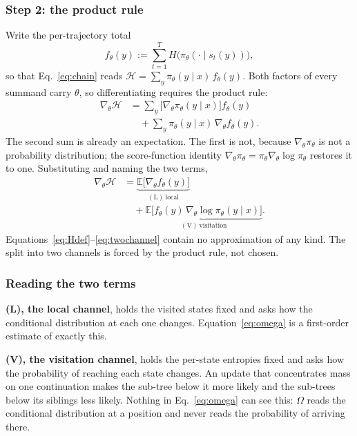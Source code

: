 \documentclass[11pt]{article}
\newcommand{\Htraj}{\mathcal{H}}
\newcommand{\Om}{\Omega}
\newcommand{\E}{\mathbb{E}}
\newcommand{\gradt}{\nabla_{\theta}}
\newcommand{\pit}{\pi_{\theta}}
\begin{document}
\subsubsection{Step 2: the product rule}

Write the per-trajectory total
%
\begin{equation}
f_\theta(y) := \sum_{t=1}^{T} H\bigl(\pit(\cdot \mid s_t(y))\bigr),
\label{eq:fdef}
\end{equation}
%
so that Eq.~\eqref{eq:chain} reads
$\Htraj = \sum_y \pit(y \mid x)\, f_\theta(y)$. Both factors of every summand carry
$\theta$, so differentiating requires the product rule:
%
\begin{equation}
\begin{split}
\gradt \Htraj
&= \sum_y \bigl[\gradt \pit(y \mid x)\bigr] f_\theta(y)\\
&\quad + \sum_y \pit(y \mid x)\, \gradt f_\theta(y).
\end{split}
\label{eq:productrule}
\end{equation}
%
The second sum is already an expectation. The first is not, because
$\gradt \pit$ is not a probability distribution; the score-function identity
$\gradt \pit = \pit \gradt \log \pit$ restores it to one. Substituting and naming
the two terms,
%
\begin{equation}
\begin{split}
\gradt \Htraj
&= \underbrace{\E\bigl[\gradt f_\theta(y)\bigr]}_{(\mathrm{L})\ \text{local}}\\
&\quad + \underbrace{\E\bigl[f_\theta(y)\,\gradt \log \pit(y \mid x)\bigr]}_{(\mathrm{V})\ \text{visitation}}.
\end{split}
\label{eq:twochannel-app}
\end{equation}
%
Equations~\eqref{eq:Hdef}--\eqref{eq:twochannel} contain no approximation of any
kind. The split into two channels is forced by the product rule, not chosen.

\subsubsection{Reading the two terms}

\textbf{(L), the local channel}, holds the visited states fixed and asks how the
conditional distribution at each one changes. Equation~\eqref{eq:omega} is a
first-order estimate of exactly this.

\textbf{(V), the visitation channel}, holds the per-state entropies fixed and asks
how the probability of reaching each state changes. An update that concentrates mass
on one continuation makes the sub-tree below it more likely and the sub-trees below
its siblings less likely. Nothing in Eq.~\eqref{eq:omega} can see this: $\Om$ reads
the conditional distribution at a position and never reads the probability of
arriving there.
\end{document}
